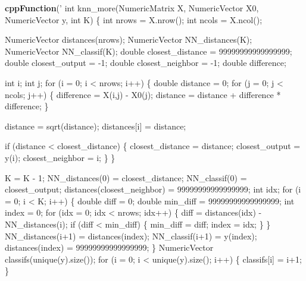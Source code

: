 \documentclass[]{article}
\newenvironment{Shaded}{\begin{snugshade}}{\end{snugshade}}
\newcommand{\KeywordTok}[1]{\textcolor[rgb]{0.13,0.29,0.53}{\textbf{#1}}}
\newcommand{\NormalTok}[1]{#1}
\newcommand{\StringTok}[1]{\textcolor[rgb]{0.31,0.60,0.02}{#1}}
\begin{document}
\begin{Shaded}
\begin{Highlighting}[]
\KeywordTok{cppFunction}\NormalTok{(}\StringTok{'}
\StringTok{int knn_more(NumericMatrix X, NumericVector X0, NumericVector y, int K) \{}
\StringTok{    int nrows = X.nrow();}
\StringTok{    int ncols = X.ncol();}

\StringTok{    NumericVector distances(nrows);}
\StringTok{    NumericVector NN_distances(K);}
\StringTok{    NumericVector NN_classif(K);}
\StringTok{    double closest_distance = 99999999999999999;}
\StringTok{    double closest_output = -1;}
\StringTok{    double closest_neighbor = -1;}
\StringTok{    double difference;}

\StringTok{    int i;}
\StringTok{    int j;}
\StringTok{    }
\StringTok{    for (i = 0; i < nrows; i++) \{}
\StringTok{        }
\StringTok{        double distance = 0;}
\StringTok{        for (j = 0; j < ncols; j++) \{}
\StringTok{            difference = X(i,j) - X0(j);}
\StringTok{            distance = distance + difference * difference;}
\StringTok{        \}}

\StringTok{        distance = sqrt(distance);}
\StringTok{        distances[i] = distance;}

\StringTok{        if (distance < closest_distance) \{}
\StringTok{            closest_distance = distance;}
\StringTok{            closest_output = y(i);}
\StringTok{            closest_neighbor = i;}
\StringTok{        \}}
\StringTok{    \}}

\StringTok{    K = K - 1;}
\StringTok{    NN_distances(0) = closest_distance;}
\StringTok{    NN_classif(0) = closest_output;}
\StringTok{    distances(closest_neighbor) = 99999999999999999;}
\StringTok{    }
\StringTok{    int idx;}
\StringTok{    for (i = 0; i < K; i++) \{}
\StringTok{      double diff = 0;}
\StringTok{      double min_diff = 99999999999999999;}
\StringTok{      int index = 0;}
\StringTok{      for (idx = 0; idx < nrows; idx++) \{}
\StringTok{        diff = distances(idx) - NN_distances(i);}
\StringTok{        if (diff < min_diff) \{}
\StringTok{          min_diff = diff;}
\StringTok{          index = idx;}
\StringTok{        \}}
\StringTok{      \}}
\StringTok{      NN_distances(i+1) = distances(index);}
\StringTok{      NN_classif(i+1) = y(index);}
\StringTok{      distances(index) = 99999999999999999;}
\StringTok{    \}}
\StringTok{    }
\StringTok{    NumericVector classifs(unique(y).size());}
\StringTok{    for (i = 0; i < unique(y).size(); i++) \{}
\StringTok{      classifs[i] = i+1;}
\StringTok{    \}}


\end{Highlighting}
\end{Shaded}
\end{document}
